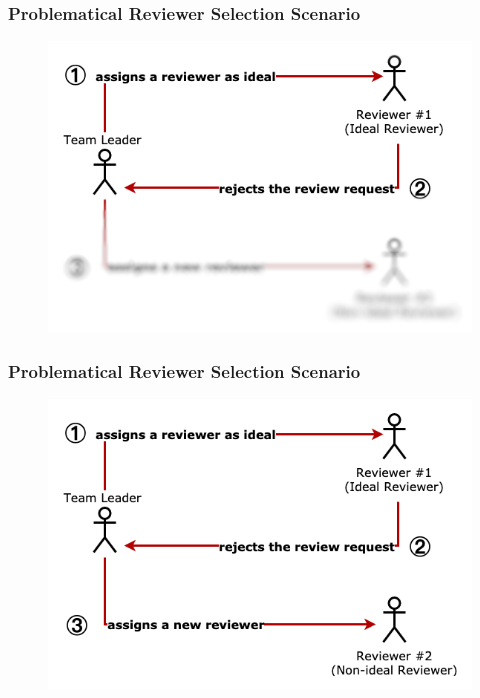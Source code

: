 \documentclass{beamer}
\begin{document}
\begin{frame}
\frametitle{\large Problematical Reviewer Selection Scenario}
  \begin{figure}
    \includegraphics[height=0.8\textheight]{img/to_blur2.png}
    \end{figure}

\end{frame}
\begin{frame}
\frametitle{\large Problematical Reviewer Selection Scenario}
  \begin{figure}
    \includegraphics[height=0.8\textheight]{img/to_blur3.png}
    \end{figure}

\end{frame}


\iffalse
\end{document}
